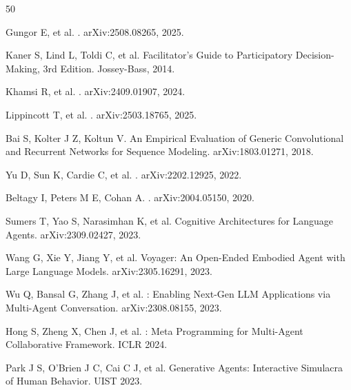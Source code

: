 \documentclass[twocolumn,10.5pt]{ctexart}
\begin{document}
\begin{thebibliography}{50}

Gungor E, et al.
.
\newblock arXiv:2508.08265, 2025.

Kaner S, Lind L, Toldi C, et al.
\newblock Facilitator's Guide to Participatory Decision-Making, 3rd Edition.
\newblock Jossey-Bass, 2014.

Khamsi R, et al.
.
\newblock arXiv:2409.01907, 2024.

Lippincott T, et al.
.
\newblock arXiv:2503.18765, 2025.

Bai S, Kolter J Z, Koltun V.
\newblock An Empirical Evaluation of Generic Convolutional and Recurrent Networks for Sequence Modeling.
\newblock arXiv:1803.01271, 2018.

Yu D, Sun K, Cardie C, et al.
.
\newblock arXiv:2202.12925, 2022.

Beltagy I, Peters M E, Cohan A.
.
\newblock arXiv:2004.05150, 2020.

Sumers T, Yao S, Narasimhan K, et al.
\newblock Cognitive Architectures for Language Agents.
\newblock arXiv:2309.02427, 2023.

Wang G, Xie Y, Jiang Y, et al.
\newblock Voyager: An Open-Ended Embodied Agent with Large Language Models.
\newblock arXiv:2305.16291, 2023.

Wu Q, Bansal G, Zhang J, et al.
: Enabling Next-Gen LLM Applications via Multi-Agent Conversation.
\newblock arXiv:2308.08155, 2023.

Hong S, Zheng X, Chen J, et al.
: Meta Programming for Multi-Agent Collaborative Framework.
\newblock ICLR 2024.

Park J S, O'Brien J C, Cai C J, et al.
\newblock Generative Agents: Interactive Simulacra of Human Behavior.
\newblock UIST 2023.


\end{thebibliography}
\end{document}

